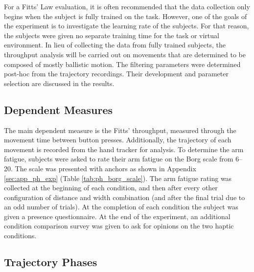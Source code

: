 For a Fitts' Law evaluation, it is often recommended that the data collection only begins when the subject is fully trained on the task.
However, one of the goals of the experiment is to investigate the learning rate of the subjects.
For that reason, the subjects were given no separate training time for the task or virtual environment.
In lieu of collecting the data from fully trained subjects, the throughput analysis will be carried out on movements that are determined to be composed of mostly ballistic motion.
The filtering parameters were determined post-hoc from the trajectory recordings.
Their development and parameter selection are discussed in the results.

\subsection{Dependent Measures}

The main dependent measure is the Fitts' throughput, measured through the movement time between button presses.
Additionally, the trajectory of each movement is recorded from the hand tracker for analysis.
To determine the arm fatigue, subjects were asked to rate their arm fatigue on the Borg scale from \numrange{6}{20}.
The scale was presented with anchors as shown in Appendix \ref{sec:app_ph_exp} (Table \ref{tab:ph_borg_scale}).
The arm fatigue rating was collected at the beginning of each condition, and then after every other configuration of distance and width combination (and after the final trial due to an odd number of trials).
At the completion of each condition the subject was given a presence questionnaire.
At the end of the experiment, an additional condition comparison survey was given to ask for opinions on the two haptic conditions.

\subsection{Trajectory Phases}
\label{sec:ph_traj_phases}

